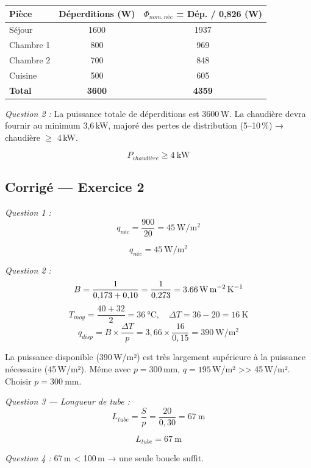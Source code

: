 \begin{center}
\begin{tabular}{lcc}
  \toprule
  Pièce & Déperditions (W) & $\Phi_{nom,néc}$ = Dép. / 0,826 (W) \\
  \midrule
  Séjour & 1600 & 1937 \\
  Chambre 1 & 800 & 969 \\
  Chambre 2 & 700 & 848 \\
  Cuisine & 500 & 605 \\
  \midrule
  \textbf{Total} & \textbf{3600} & \textbf{4359} \\
  \bottomrule
\end{tabular}
\end{center}

\textit{Question 2 :} La puissance totale de déperditions est 3600\,W. La chaudière devra fournir au minimum 3,6\,kW, majoré des pertes de distribution (5–10\,\%) → chaudière $\geq$ 4\,kW.

\[
  \boxed{P_{chaudière} \geq \SI{4}{\kilo\watt}}
\]


\subsection*{Corrigé — Exercice 2}

\textit{Question 1 :}
\[
  q_{néc} = \frac{900}{20} = \SI{45}{\watt\per\square\metre}
\]

\[
  \boxed{q_{néc} = \SI{45}{\watt\per\square\metre}}
\]

\textit{Question 2 :}
\[
  B = \frac{1}{0{,}173 + 0{,}10} = \frac{1}{0{,}273} = \SI{3{,}66}{\watt\per\square\metre\per\kelvin}
\]
\[
  T_{moy} = \frac{40 + 32}{2} = \SI{36}{\celsius}, \quad \Delta T = 36 - 20 = \SI{16}{\kelvin}
\]
\[
  q_{disp} = B \times \frac{\Delta T}{p} = 3{,}66 \times \frac{16}{0{,}15} = \SI{390}{\watt\per\square\metre}
\]

La puissance disponible (390\,W/m²) est très largement supérieure à la puissance nécessaire (45\,W/m²). Même avec $p = 300$\,mm, $q = 195$\,W/m² >> 45\,W/m². Choisir $p = \SI{300}{\milli\metre}$.

\textit{Question 3 — Longueur de tube :}
\[
  L_{tube} = \frac{S}{p} = \frac{20}{0{,}30} = \SI{67}{\metre}
\]

\[
  \boxed{L_{tube} = \SI{67}{\metre}}
\]

\textit{Question 4 :} 67\,m < 100\,m → une seule boucle suffit.

